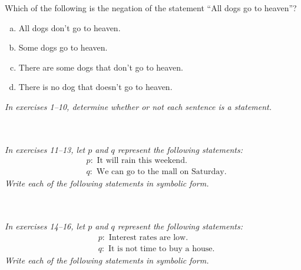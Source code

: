 \begin{try}
Which of the following is the negation of the statement ``All dogs go to heaven''?
\begin{enumerate}[(a)]
\item All dogs don't go to heaven.
\item Some dogs go to heaven.
\item There are some dogs that don't go to heaven.
\item There is no dog that doesn't go to heaven.
\end{enumerate}
\end{try}

\begin{exercises}
\textit{In exercises 1--10, determine whether or not each sentence is a statement.}





\\ \\

\textit{In exercises 11--13, let $p$ and $q$ represent the following statements:}
\begin{align*}
&p: \textrm{ It will rain this weekend.}\\
&q: \textrm{ We can go to the mall on Saturday.}
\end{align*}
\textit{Write each of the following statements in symbolic form.}

\\ \\

\textit{In exercises 14--16, let $p$ and $q$ represent the following statements:}
\begin{align*}
&p: \textrm{ Interest rates are low.}\\
&q: \textrm{ It is not time to buy a house.}
\end{align*}
\textit{Write each of the following statements in symbolic form.}


\end{exercises}
